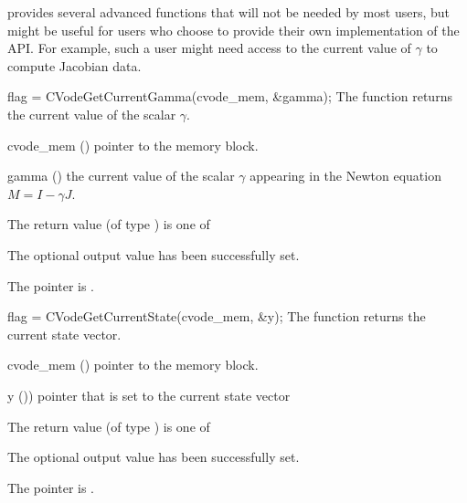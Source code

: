 {\cvode} provides several advanced functions that will not be needed by most
users, but might be useful for users who choose to provide their own
implementation of the  API. For example, such a user
might need access to the current value of $\gamma$ to compute Jacobian data.

{
  flag = CVodeGetCurrentGamma(cvode\_mem, \&gamma);
}
{
  The function  returns the current
  value of the scalar $\gamma$.
}
{
  \begin{args}
  \item[cvode\_mem] ()
    pointer to the {\cvode} memory block.
  \item[gamma] ()
      the current value of the scalar $\gamma$ appearing in the
      Newton equation $M = I - \gamma J$.
  \end{args}
}
{
  The return value  (of type ) is one of
  \begin{args}
  \item[\Id{CV\_SUCCESS}]
    The optional output value has been successfully set.
  \item[\Id{CV\_MEM\_NULL}]
    The  pointer is .
  \end{args}
}
{}
{
  flag = CVodeGetCurrentState(cvode\_mem, \&y);
}
{
  The function  returns the current state vector.
}
{
  \begin{args}
  \item[cvode\_mem] ()
    pointer to the {\cvode} memory block.
  \item[y] ())
    pointer that is set to the current state vector
  \end{args}
}
{
  The return value  (of type ) is one of
  \begin{args}
  \item[\Id{CV\_SUCCESS}]
    The optional output value has been successfully set.
  \item[\Id{CV\_MEM\_NULL}]
    The  pointer is .
  \end{args}
}
{}





